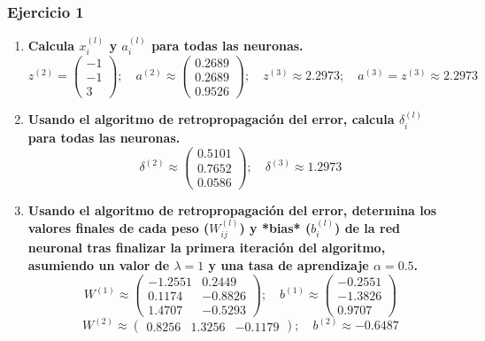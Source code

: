 \documentclass[11pt]{article}
\begin{document}
\subsubsection*{Ejercicio 1}

\begin{enumerate}
\item \textbf{Calcula $x_i^{(l)}$ y $a_i^{(l)}$ para todas las neuronas.}
\begin{equation}
z^{(2)} =
\begin{pmatrix}
-1 \\
-1 \\
3
\end{pmatrix}; \quad 
a^{(2)} \approx
\begin{pmatrix}
0.2689 \\
0.2689 \\
0.9526
\end{pmatrix}; \quad 
z^{(3)} \approx 2.2973; \quad a^{(3)} = z^{(3)} \approx 2.2973
\end{equation}
\item \textbf{Usando el algoritmo de retropropagación del error, calcula $\delta_i^{(l)}$ para todas las neuronas.}
\begin{equation}
\delta^{(2)} \approx
\begin{pmatrix}
0.5101 \\
0.7652 \\
0.0586
\end{pmatrix}; \quad 
\delta^{(3)} \approx 1.2973
\end{equation}
\item \textbf{Usando el algoritmo de retropropagación del error, determina los valores finales de cada peso ($W_{ij}^{(l)}$) y *bias* ($b_i^{(l)}$) de la red neuronal tras finalizar la primera iteración del algoritmo, asumiendo un valor de $\lambda = 1$ y una tasa de aprendizaje $\alpha = 0.5$.}
\begin{equation}
W^{(1)} \approx
\begin{pmatrix}
-1.2551 & 0.2449 \\
0.1174 & -0.8826 \\
1.4707 & -0.5293
\end{pmatrix}; \quad 
b^{(1)} \approx 
\begin{pmatrix}
-0.2551 \\
-1.3826 \\
0.9707 
\end{pmatrix}
\end{equation}
\begin{equation}
W^{(2)} \approx
\begin{pmatrix}
0.8256 & 1.3256 & -0.1179
\end{pmatrix}; \quad 
b^{(2)} \approx -0.6487
\end{equation}
\end{enumerate}
\end{document}
